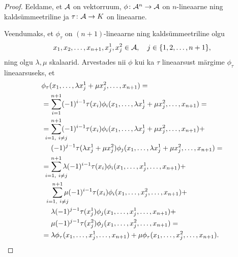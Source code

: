 \begin{proof}
    Eeldame, et $\mathcal{A}$ on vektorruum, $\phi \colon \mathcal{A}^n \to \mathcal{A}$ on
    $n$-lineaarne ning kaldsümmeetriline ja $\tau \colon \mathcal{A} \to K$
    on lineaarne.

    Veendumaks, et $\phi_\tau$ on $(n+1)$-lineaarne ning
    kaldsümmeetriline olgu
    \[
        x_1, x_2, \dots, x_{n+1}, x_j^1, x_j^2 \in \mathcal{A},
        \quad
        j \in \{1, 2, \dots, n+1\},
    \]
    ning olgu $\lambda, \mu$ skalaarid. Arvestades nii
    $\phi$ kui ka $\tau$ lineaarsust märgime $\phi_\tau$
    lineaarsuseks, et
    \begin{align*}
        &\phi_\tau(
            x_1, \dots, \lambda x_j^1 + \mu x_j^2, \dots, x_{n+1}
        ) = \\
        &= \sum_{i=1}^{n+1} (-1)^{i-1} \tau(x_i) \phi_i(
             x_1, \dots, \lambda x_j^1 + \mu x_j^2, \dots, x_{n+1}
           ) = \\
        &= \sum_{\mathclap{i=1,\ i \ne j}}^{n+1} (-1)^{i-1}
           \tau(x_i) \phi_i(
             x_1, \dots, \lambda x_j^1 + \mu x_j^2, \dots, x_{n+1}
           ) + \\
        &\quad\ (-1)^{j-1} \tau(\lambda x_j^1 + \mu x_j^2)
           \phi_j(
             x_1, \dots, \lambda x_j^1 + \mu x_j^2, \dots, x_{n+1}
           ) = \\
        &= \sum_{\mathclap{i=1,\ i \ne j}}^{n+1}
           \lambda (-1)^{i-1} \tau(x_i) \phi_i(
             x_1, \dots, x_j^1, \dots, x_{n+1}
           ) + \\
        &\quad\ \sum_{\mathclap{i=1,\ i \ne j}}^{n+1} \mu
           (-1)^{i-1} \tau(x_i)
           \phi_i( x_1, \dots, x_j^2, \dots, x_{n+1} ) + \\
        &\quad\ \lambda (-1)^{j-1} \tau(x_j^1) \phi_j(
             x_1, \dots, x_j^1, \dots, x_{n+1}) + \\
        &\quad\ \mu (-1)^{j-1} \tau(x_j^2) \phi_j(
             x_1, \dots, x_j^2, \dots, x_{n+1}) = \\
        &= \lambda \phi_\tau(x_1, \dots, x_j^1, \dots, x_{n+1}) +
           \mu \phi_\tau(x_1, \dots, x_j^2, \dots, x_{n+1}).
    \end{align*}


\end{proof}
